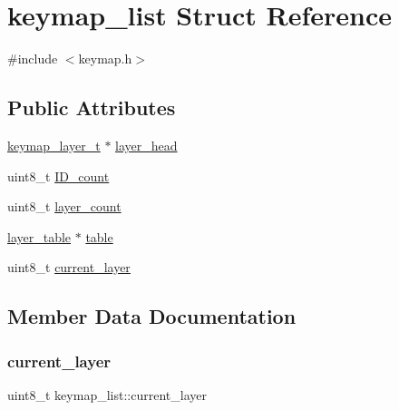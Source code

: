 \hypertarget{structkeymap__list}{}\section{keymap\+\_\+list Struct Reference}
\label{structkeymap__list}


{\ttfamily \#include $<$keymap.\+h$>$}

\subsection*{Public Attributes}
\begin{DoxyCompactItemize}
\item 
\hyperlink{keymap_8h_a09117a6f418904d4009f63e96c2b9b92}{keymap\+\_\+layer\+\_\+t} $\ast$ \hyperlink{structkeymap__list_ab28e9ca3fa7f418768c57d5c7633d490}{layer\+\_\+head}
\item 
uint8\+\_\+t \hyperlink{structkeymap__list_a7f15a3d98deece488497db696e1dffbb}{I\+D\+\_\+count}
\item 
uint8\+\_\+t \hyperlink{structkeymap__list_a1dec5b93f480c7759713e01d9019e121}{layer\+\_\+count}
\item 
\hyperlink{structlayer__table}{layer\+\_\+table} $\ast$ \hyperlink{structkeymap__list_a5b916d759e7d6e03863eb72593988747}{table}
\item 
uint8\+\_\+t \hyperlink{structkeymap__list_abe61c194181adfe034f9e852c68b31fc}{current\+\_\+layer}
\end{DoxyCompactItemize}


\subsection{Member Data Documentation}
\mbox{\label{structkeymap__list_abe61c194181adfe034f9e852c68b31fc}} 
\subsubsection{\texorpdfstring{current\+\_\+layer}{current\_layer}}
{\footnotesize\ttfamily uint8\+\_\+t keymap\+\_\+list\+::current\+\_\+layer}

\mbox{\label{structkeymap__list_a7f15a3d98deece488497db696e1dffbb}} 
